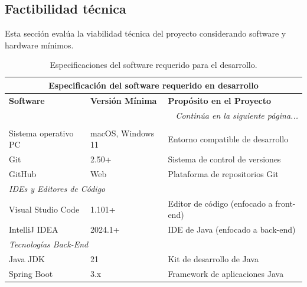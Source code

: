 \subsection{Factibilidad técnica}
Esta sección evalúa la viabilidad técnica del proyecto considerando software y hardware mínimos.
\begin{longtable}{|p{}|p{}|p{}|}
\caption{Especificaciones del software requerido para el desarrollo.}
\label{tab:software_desarrollo} \\

\hline
\multicolumn{3}{|c|}{\textbf{Especificación del software requerido en desarrollo}} \\
\hline
\textbf{Software} & \textbf{Versión Mínima} & \textbf{Propósito en el Proyecto} \\
\hline
\endhead %


\hline
\multicolumn{3}{|r|}{\small\textit{Continúa en la siguiente página...}} \\
\hline
\endfoot

\hline
\endlastfoot


\multicolumn{3}{|l|}{\textit{Entorno y Control de Versiones}} \\ \hline
Sistema operativo PC & macOS, Windows 11 & Entorno compatible de desarrollo \\
Git & 2.50+ & Sistema de control de versiones \\
GitHub & Web & Plataforma de repositorios Git \\ \hline

\multicolumn{3}{|l|}{\textit{IDEs y Editores de Código}} \\ \hline
Visual Studio Code & 1.101+ & Editor de código (enfocado a front-end) \\
IntelliJ IDEA & 2024.1+ & IDE de Java (enfocado a back-end) \\ \hline

\multicolumn{3}{|l|}{\textit{Tecnologías Back-End}} \\ \hline
Java JDK & 21 & Kit de desarrollo de Java \\
Spring Boot & 3.x & Framework de aplicaciones Java \\ \hline


\end{longtable}
